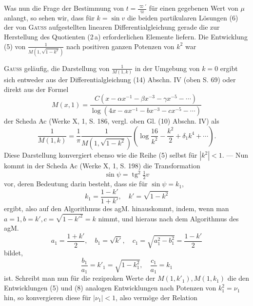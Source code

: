 Was nun die Frage der Bestimmung von \(t=\frac{\varpi'}\varpi\) für einen gegebenen
Wert von \(\mu\) anlangt, so sehen wir, dass für \(k=\sin v\) die beiden partikularen
Lösungen (6) der von \textsc{Gauss} aufgestellten linearen Differentialgleichung gerade
die zur Herstellung des Quotienten (2\,a) erforderlichen Elemente liefern. Die
Entwicklung (5) von \(\frac1{M(1,\sqrt{1-k^2})}\) nach positiven ganzen Potenzen von \(k^2\) war\par
\clearpage{}
\noindent \textsc{Gauss} geläufig, die Darstellung von \(\frac1{M(1,k)}\) in der Umgebung von \(k=0\) ergibt
sich entweder aus der Differentialgleichung (14) Abschn. IV (oben S. 69)
oder direkt aus der Formel
\[
M(x,1)=\frac{C(x-\alpha x^{-1}-\beta x^{-3}-\gamma x^{-5}-\cdots)}{\log(4x-ax^{-1}-bx^{-3}-cx^{-5}-\cdots)}
\]
\noindent der Scheda Ac (Werke X, 1, S. 186, vergl. oben Gl. (10) Abschn. IV) als
\begingroup\makeatletter\tagsleft@true\let\veqno\leqno\makeatother
\begin{equation*}
\frac1{M(1,k)}=\frac1\pi\frac1{M(1,\sqrt{1-k^2})}
\left(\log\frac{16}{k^2}-\frac{k^2}2+\delta_1k^4+\cdots\right).\tag{8}
\end{equation*}
\endgroup
\noindent Diese Darstellung konvergiert ebenso wie die Reihe (5) selbst für \(|k^2|<1\). —
Nun kommt in der Scheda Ac (Werke X, 1, S. 198) die Transformation
\begingroup\makeatletter\tagsleft@true\let\veqno\leqno\makeatother
\begin{equation*}
\sin\psi=\operatorname{tg}^2\tfrac12v\tag{9}
\end{equation*}
\endgroup
\noindent vor, deren Bedeutung darin besteht, dass sie für \(\sin\psi=k_1\),
\begingroup\makeatletter\tagsleft@true\let\veqno\leqno\makeatother
\begin{equation*}
k_1=\frac{1-k'}{1+k'},\quad k'=\sqrt{1-k^2}\tag{9\,a}
\end{equation*}
\endgroup
\noindent ergibt, also auf den Algorithmus des agM. hinauskommt, indem, wenn man
\(a=1,b=k',c=\sqrt{1-k'^2}=k\) nimmt, und hieraus nach dem Algorithmus
des agM.
\[
a_1=\frac{1+k'}2,\quad b_1=\sqrt{k'},\quad c_1=\sqrt{a_1^2-b_1^2}=\frac{1-k'}2
\]
\noindent bildet,
\[
\frac{b_1}{a_1}=k'_1=\sqrt{1-k_1^2},\quad\frac{c_1}{a_1}=k_1
\]
\noindent ist. Schreibt man nun für die reziproken Werte der \(M(1,k'_1),M(1,k_1)\) die
den Entwicklungen (5) und (8) analogen Entwicklungen nach Potenzen von
\(k_1^2=\nu_1\) hin, so konvergieren diese für \(|\nu_1|<1\), also vermöge der Relation
